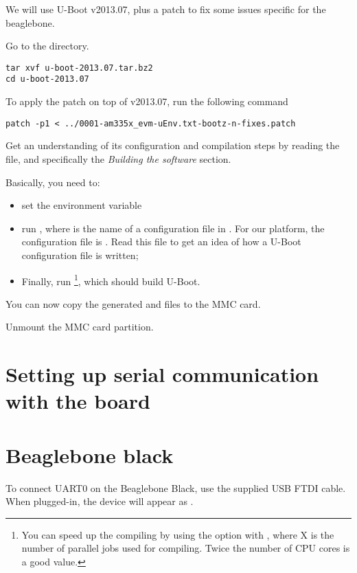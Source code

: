 We will use U-Boot v2013.07, plus a patch to fix some issues specific for the beaglebone.

Go to the  directory.

\begin{verbatim}
tar xvf u-boot-2013.07.tar.bz2
cd u-boot-2013.07
\end{verbatim}

To apply the patch on top of v2013.07, run the following command

\begin{verbatim}
patch -p1 < ../0001-am335x_evm-uEnv.txt-bootz-n-fixes.patch
\end{verbatim}


Get an understanding of its configuration and compilation steps by
reading the  file, and specifically the {\em Building the
  software} section.

Basically, you need to:

\begin{itemize}

\item set the  environment variable

\item run , where  is the name
  of a configuration file in . For our
  platform, the configuration file is
  . Read this file to get an idea of
  how a U-Boot configuration file is written;

\item Finally, run \footnote{You can speed up the compiling
  by using the  option with , where X is the number of parallel
  jobs used for compiling. Twice the number of CPU cores is a good
  value.}, which should build U-Boot.

\end{itemize}

You can now copy the generated  and  files to the MMC card.

Unmount the MMC card partition.

\section{Setting up serial communication with the board}

\section{Beaglebone black}
To connect UART0 on the Beaglebone Black, use the supplied USB FTDI cable.
When plugged-in, the device will appear as .

